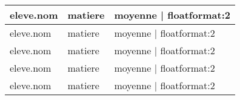 \documentclass[10pt,a4paper]{article}
\begin{document}
\begin{longtable}{|l|l|l|}
{{ eleve.nom }} & {{ matiere }} & {{ moyenne | floatformat:2 }} \\ \hline

{{ eleve.nom }} & {{ matiere }} & {{ moyenne | floatformat:2 }} \\ \hline

{{ eleve.nom }} & {{ matiere }} & {{ moyenne | floatformat:2 }} \\ \hline

{{ eleve.nom }} & {{ matiere }} & {{ moyenne | floatformat:2 }} \\ \hline

{{ eleve.nom }} & {{ matiere }} & {{ moyenne | floatformat:2 }} \\ \hline


\end{longtable}
\end{document}
